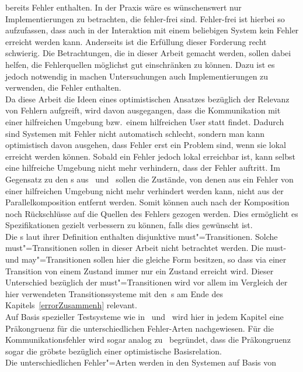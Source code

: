 bereits Fehler enthalten. In der Praxis wäre es wünschenswert nur
Implementierungen zu betrachten, die fehler-frei sind. Fehler-frei ist hierbei
so aufzufassen, dass auch in der Interaktion mit einem beliebigen System kein
Fehler erreicht werden kann. Anderseits ist die Erfüllung dieser Forderung
recht schwierig. Die Betrachtungen, die in dieser Arbeit gemacht werden, sollen
dabei helfen, die Fehlerquellen möglichst gut einschränken zu können. Dazu ist
es jedoch notwendig in machen Untersuchungen auch Implementierungen zu
verwenden, die Fehler enthalten.\\
Da diese Arbeit die Ideen eines optimistischen Ansatzes bezüglich der Relevanz
von Fehlern aufgreift, wird davon ausgegangen, dass die Kommunikation
mit einer hilfreichen Umgebung bzw.\ einem hilfreichen User statt findet.
Dadurch sind Systemen mit Fehler nicht automatisch schlecht, sondern man kann
optimistisch davon ausgehen, dass Fehler erst ein Problem sind, wenn sie lokal
erreicht werden können. Sobald ein Fehler jedoch lokal erreichbar ist, kann
selbst eine hilfreiche Umgebung nicht mehr verhindern, dass der Fehler
auftritt. Im Gegensatz zu den \MIA{}s aus~\cite{Luttgen2013MIA1}
und~\cite{Vogler2016MIA3} sollen die Zustände, von denen aus ein Fehler von
einer hilfreichen Umgebung nicht mehr verhindert werden kann, nicht aus der
Parallelkomposition entfernt werden. Somit können auch nach der Komposition
noch Rückschlüsse auf die Quellen des Fehlers gezogen werden. Dies ermöglicht
es Spezifikationen gezielt verbessern zu können, falls dies gewünscht ist.\\
Die \MIA{}s laut ihrer Definition enthalten disjunktive must"=Transitionen.
Solche must"=Transitionen sollen in dieser Arbeit nicht betrachtet werden. Die
must- und may"=Transitionen sollen hier die gleiche Form besitzen, so dass via
einer Transition von einem Zustand immer nur ein Zustand erreicht wird. Dieser
Unterschied bezüglich der must"=Transitionen wird vor allem im Vergleich der
hier verwendeten Transitionssysteme mit den~\MIA{}s am Ende des
Kapitels~\ref{errorZusammenh} relevant.\\
Auf Basis spezieller Testsysteme wie in~\cite{Vogler2015FailSem}
und~\cite{Vogler2017dMTS} wird hier in jedem Kapitel eine Präkongruenz für die
unterschiedlichen Fehler-Arten nachgewiesen. Für die Kommunikationsfehler wird
sogar analog zu~\cite{Schinko2016BA} begründet, dass die Präkongruenz sogar die
gröbste bezüglich einer optimistische Basisrelation.\\
Die unterschiedlichen Fehler"=Arten werden in den Systemen auf Basis von
